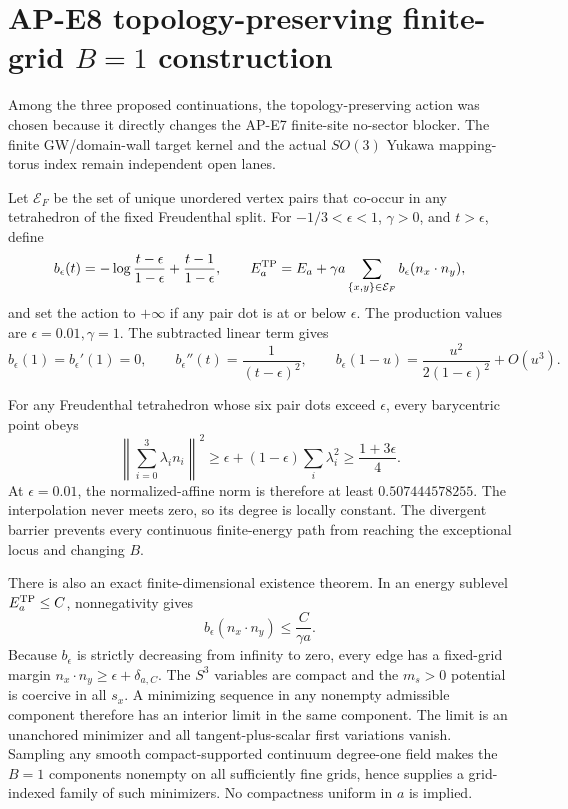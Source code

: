 \documentclass[11pt]{article}
\numberwithin{equation}{section}
\begin{document}
\section{AP-E8 topology-preserving finite-grid \texorpdfstring{$B=1$}{B=1} construction}
\label{sec:ap-e8-topology}

Among the three proposed continuations, the topology-preserving action was
chosen because it directly changes the AP-E7 finite-site no-sector blocker.
The finite GW/domain-wall target kernel and the actual \(SO(3)\) Yukawa
mapping-torus index remain independent open lanes.

Let \(\mathcal E_F\) be the set of unique unordered vertex pairs that
co-occur in any tetrahedron of the fixed Freudenthal split.  For
\(-1/3<\epsilon<1\), \(\gamma>0\), and \(t>\epsilon\), define
\begin{equation}
 b_\epsilon(t)=-\log\frac{t-\epsilon}{1-\epsilon}
 +\frac{t-1}{1-\epsilon},\qquad
 E^{\rm TP}_{a}=E_a+\gamma a\sum_{\{x,y\}\in\mathcal E_F}
 b_\epsilon(n_x\cdot n_y),
 \label{eq:e8-action}
\end{equation}
and set the action to \(+\infty\) if any pair dot is at or below
\(\epsilon\).  The production values are \(\epsilon=0.01,\gamma=1\).
The subtracted linear term gives
\begin{equation}
 b_\epsilon(1)=b_\epsilon'(1)=0,\qquad
 b_\epsilon''(t)=\frac1{(t-\epsilon)^2},\qquad
 b_\epsilon(1-u)=\frac{u^2}{2(1-\epsilon)^2}+O(u^3).
 \label{eq:e8-barrier-calculus}
\end{equation}

For any Freudenthal tetrahedron whose six pair dots exceed \(\epsilon\),
every barycentric point obeys
\begin{equation}
 \left\|\sum_{i=0}^3\lambda_i n_i\right\|^2
 \ge\epsilon+(1-\epsilon)\sum_i\lambda_i^2
 \ge\frac{1+3\epsilon}{4}.
 \label{eq:e8-affine-bound}
\end{equation}
At \(\epsilon=0.01\), the normalized-affine norm is therefore at least
\(0.507444578255\).  The interpolation never meets zero, so its degree is
locally constant.  The divergent barrier prevents every continuous
finite-energy path from reaching the exceptional locus and changing \(B\).

There is also an exact finite-dimensional existence theorem.  In an energy
sublevel \(E_a^{\rm TP}\le C\), nonnegativity gives
\begin{equation}
 b_\epsilon(n_x\cdot n_y)\le\frac{C}{\gamma a}.
 \label{eq:e8-sublevel}
\end{equation}
Because \(b_\epsilon\) is strictly decreasing from infinity to zero, every
edge has a fixed-grid margin \(n_x\cdot n_y\ge\epsilon+\delta_{a,C}\).
The \(S^3\) variables are compact and the \(m_s>0\) potential is coercive in
all \(s_x\).  A minimizing sequence in any nonempty admissible component
therefore has an interior limit in the same component.  The limit is an
unanchored minimizer and all tangent-plus-scalar first variations vanish.
Sampling any smooth compact-supported continuum degree-one field makes the
\(B=1\) components nonempty on all sufficiently fine grids, hence supplies a
grid-indexed family of such minimizers.  No compactness uniform in \(a\) is
implied.
\end{document}
